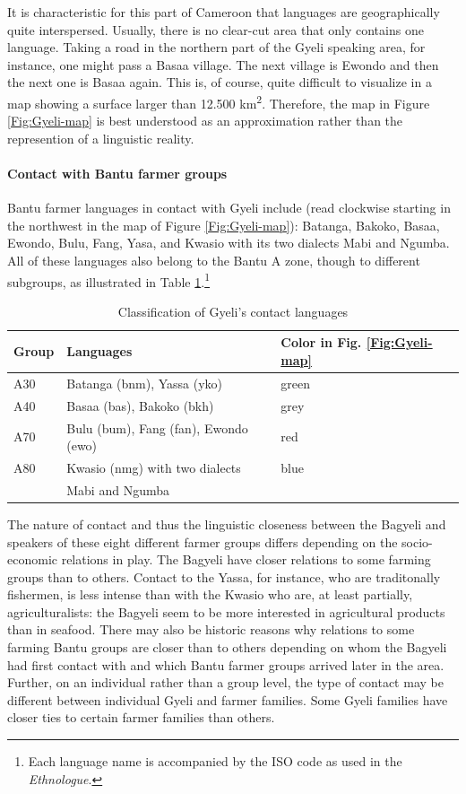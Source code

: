 It is characteristic for this part of Cameroon that languages are geographically quite interspersed. Usually, there is no clear-cut area that only contains one language. Taking a road in the northern part of the Gyeli speaking area, for instance, one might pass a Basaa village. The next village is Ewondo and then the next one is Basaa again. This is, of course, quite difficult to visualize in a map showing a surface larger than 12.500 km\textsuperscript{2}. Therefore, the map in Figure \ref{Fig:Gyeli-map} is best understood as an approximation rather than the represention of a linguistic reality. 


\paragraph{Contact with Bantu farmer groups} Bantu farmer languages in contact with Gyeli include (read clockwise starting in the northwest in the map of Figure \ref{Fig:Gyeli-map}): Batanga, Bakoko, Basaa, Ewondo, Bulu, Fang, Yasa, and Kwasio with its two dialects Mabi and Ngumba. All of these languages also belong to the Bantu A zone, though to different subgroups, as illustrated in Table \ref{Tab:Contact}.\footnote{Each language name is accompanied by the ISO code as used in the {\itshape Ethnologue}.}
 
\begin{table}[!h]
\centering
\begin{tabular}{|l|l|l|}
 \midrule
Group & Languages & Color in Fig. \ref{Fig:Gyeli-map} \\
 \midrule
A30 & Batanga (bnm), Yassa (yko) & green \\
A40 & Basaa (bas), Bakoko (bkh) & grey \\
A70 & Bulu (bum), Fang (fan), Ewondo (ewo) & red \\
A80 & Kwasio (nmg) with two dialects & blue \\
 &  Mabi and Ngumba &  \\
 \midrule
\end{tabular}
\caption{Classification of Gyeli's contact languages}
\label{Tab:Contact}
\end{table}

The nature of contact and thus the linguistic closeness between the Bagyeli and speakers of these eight different farmer groups differs depending on the socio-economic relations in play. The Bagyeli have closer relations to some farming groups than to others. Contact to the Yassa, for instance, who are traditonally fishermen, is less intense than with the Kwasio who are, at least partially, agriculturalists: the Bagyeli seem to be more interested in agricultural products than in seafood. There may also be historic reasons why relations to some farming Bantu groups are closer than to others depending on whom the Bagyeli had first contact with and which Bantu farmer groups arrived later in the area. Further, on an individual rather than a group level, the type of contact may be different between individual Gyeli and farmer families. Some Gyeli families have closer ties to certain farmer families than others. 

